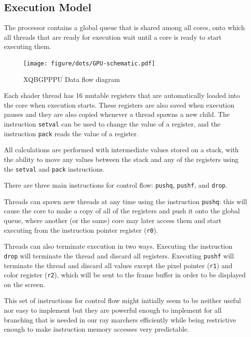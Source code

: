 		\subsection{Execution Model}

			The processor contains a global queue that is shared among all
			cores, onto which all threads that are ready for execution wait
			until a core is ready to start executing them.

			\begin{figure}[H]
				\centering
				\caption{ XQBGPPPU Data flow diagram }
					\texttt{[image: figure/dots/GPU-schematic.pdf]} 
				\vspace{-4pt}
			\end{figure}
	
			Each shader thread has 16 mutable registers that are automatically
			loaded into the core when execution starts. These registers are
			also saved when execution pauses and they are also copied whenever
			a thread spawns a new child. The instruction \texttt{setval} can be
			used to change the value of a register, and the instruction
			\texttt{pack} reads the value of a register.

			All calculations are performed with intermediate values stored on a
			stack, with the ability to move any values between the stack and
			any of the registers using the \texttt{setval} and \texttt{pack}
			instructions.

			There are three main instructions for control flow: \texttt{pushq},
			\texttt{pushf}, and \texttt{drop}. 

			Threads can spawn new threads at any time using the instruction
			\texttt{pushq}: this will cause the core to make a copy of all of
			the registers and push it onto the global queue, where another (or
			the same) core may later access them and start executing from the
			instruction pointer register (\texttt{r0}).

			Threads can also terminate execution in two ways. Executing the
			instruction \texttt{drop} will terminate the thread and discard all
			registers. Executing \texttt{pushf} will terminate the thread and
			discard all values except the pixel pointer (\texttt{r1}) and color
			register (\texttt{r2}), which will be sent to the frame buffer in
			order to be displayed on the screen.

			This set of instructions for control flow might initially seem to
			be neither useful nor easy to implement but they are powerful
			enough to implement for all branching that is needed in our ray
			marchers efficiently while being restrictive enough to make
			instruction memory accesses very predictable.

